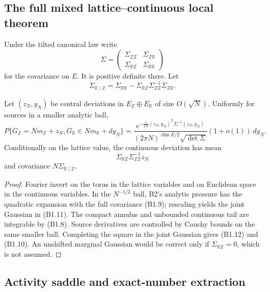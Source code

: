 \subsection{The full mixed lattice--continuous local theorem}

Under the tilted canonical law write
\[
 \Sigma=
 \begin{pmatrix}
 \Sigma_{\mathbb Z\mathbb Z}&\Sigma_{\mathbb Z\mathbb R}\\
 \Sigma_{\mathbb R\mathbb Z}&\Sigma_{\mathbb R\mathbb R}
 \end{pmatrix}                                           \tag{B1.9}
\]
for the covariance on $E$.  It is positive definite there.  Let
\[
 \Sigma_{\mathbb R\mid\mathbb Z}
 =\Sigma_{\mathbb R\mathbb R}
 -\Sigma_{\mathbb R\mathbb Z}
  \Sigma_{\mathbb Z\mathbb Z}^{-1}
  \Sigma_{\mathbb Z\mathbb R}.                          \tag{B1.10}
\]

\begin{theorem}
\label{thm:r23-b1-llt}
Let $(z_N,y_N)$ be central deviations in
$E_{\mathbb Z}\oplus E_{\mathbb R}$ of size $O(\sqrt N)$.  Uniformly for
sources in a smaller analytic ball,
\[
 P\{G_{\mathbb Z}=Nm_{\mathbb Z}+z_N,
       G_{\mathbb R}\in Nm_{\mathbb R}+dy_N\}
 =\frac{
 e^{-\frac1{2N}(z_N,y_N)^\mathsf T\Sigma^{-1}(z_N,y_N)}}
 {(2\pi N)^{\dim E/2}\sqrt{\det\Sigma}}
 (1+o(1))\,dy_N.                                         \tag{B1.11}
\]
Conditionally on the lattice value, the continuous deviation has mean
\[
 \Sigma_{\mathbb R\mathbb Z}
 \Sigma_{\mathbb Z\mathbb Z}^{-1}z_N                    \tag{B1.12}
\]
and covariance $N\Sigma_{\mathbb R\mid\mathbb Z}$.
\end{theorem}

\begin{proof}
Fourier invert on the torus in the lattice variables and on Euclidean space in
the continuous variables.  In the $N^{-1/2}$ ball, B2's analytic pressure has
the quadratic expansion with the full covariance (B1.9); rescaling yields the
joint Gaussian in (B1.11).  The compact annulus and unbounded continuous tail
are integrable by (B1.8).  Source derivatives are controlled by Cauchy bounds
on the same smaller ball.  Completing the square in the joint Gaussian gives
(B1.12) and (B1.10).  An unshifted marginal Gaussian would be correct only if
$\Sigma_{\mathbb R\mathbb Z}=0$, which is not assumed.
\end{proof}

\subsection{Activity saddle and exact-number extraction}

